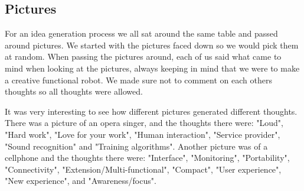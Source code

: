 \subsection{Pictures}

For an idea generation process we all sat around the same table and passed around pictures. We started with the pictures faced down so we would pick them at random. When passing the pictures around, each of us said what came to mind when looking at the pictures, always keeping in mind that we were to make a creative functional robot. We made sure not to comment on each others thoughts so all thoughts were allowed. 




It was very interesting to see how different pictures generated different thoughts. There was a picture of an opera singer, and the thoughts there were: "Loud", "Hard work", "Love for your work", "Human interaction", "Service provider", "Sound recognition" and "Training algorithms". 
Another picture was of a cellphone and the thoughts there were: "Interface", "Monitoring", "Portability", "Connectivity", "Extension/Multi-functional", "Compact", "User experience", "New experience", and "Awareness/focus". 

